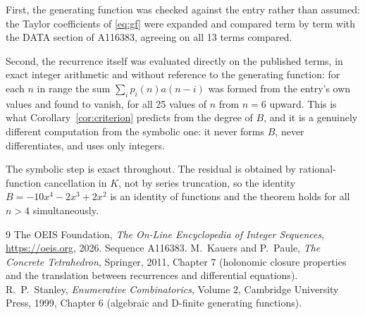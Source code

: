 \documentclass[11pt,a4paper]{article}
\theoremstyle{plain}
\theoremstyle{definition}
\begin{document}
First, the generating function was checked against the entry rather than assumed: the
Taylor coefficients of \eqref{eq:gf} were expanded and compared term by term with the DATA
section of A116383, agreeing on all 13 terms compared.

Second, the recurrence itself was evaluated directly on the published terms, in exact
integer arithmetic and without reference to the generating function: for each $n$ in range
the sum $\sum_{i}p_{i}(n)a(n-i)$ was formed from the entry's own values and found to
vanish, for all 25 values of $n$ from $n=6$ upward. This is what
Corollary~\ref{cor:criterion} predicts from the degree of $B$, and it is a genuinely
different computation from the symbolic one: it never forms $B$, never differentiates, and
uses only integers.

The symbolic step is exact throughout. The residual is obtained by rational-function
cancellation in $K$, not by series truncation, so the identity $B=- 10 x^{4} - 2 x^{3} + 2 x^{2}$ is an
identity of functions and the theorem holds for all $n>4$ simultaneously.

\begin{thebibliography}{9}
 The OEIS Foundation, \emph{The On-Line Encyclopedia of Integer Sequences},
\url{https://oeis.org}, 2026. Sequence A116383.
 M.~Kauers and P.~Paule, \emph{The Concrete Tetrahedron}, Springer, 2011,
Chapter 7 (holonomic closure properties and the translation between recurrences and
differential equations).
 R.~P.~Stanley, \emph{Enumerative Combinatorics}, Volume 2, Cambridge
University Press, 1999, Chapter 6 (algebraic and D-finite generating functions).
\end{thebibliography}
\end{document}
